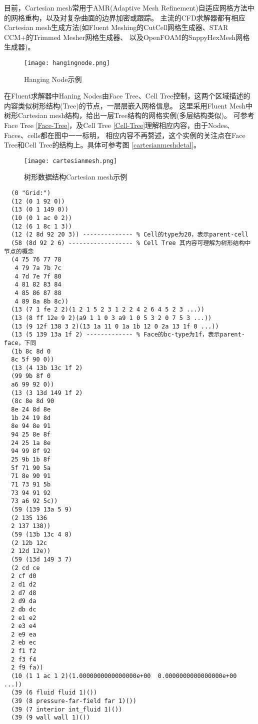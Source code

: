\documentclass[lang=cn,11pt,a4paper]{elegantpaper} %
\begin{document}
目前，Cartesian mesh常用于AMR(Adaptive Mesh Refinement)自适应网格方法中的网格重构，以及对复杂曲面的边界加密或跟踪。
主流的CFD求解器都有相应Cartesian mesh生成方法(如Fluent Meshing的CutCell网格生成器、STAR CCM+的Trimmed Mesher网格生成器、
以及OpenFOAM的SnppyHexMesh网格生成器)。
\begin{figure}[!htb]
  \centering
  \texttt{[image: hangingnode.png]}
  \caption{Hanging Node示例}
  \label{hangingnode}
\end{figure}

在Fluent求解器中Haning Nodes由Face Tree、Cell Tree控制，这两个区域描述的内容类似树形结构(Tree)的节点，一层层嵌入网格信息。
这里采用Fluent Mesh中树形Cartesian mesh结构，给出一层Tree结构的网格实例(多层结构类似)。
可参考Face Tree \ref{Face-Tree}，及Cell Tree \ref{Cell-Tree}理解相应内容，由于Nodes、Faces、cells都在图中一一标明，
相应内容不再赘述，这个实例的关注点在Face Tree和Cell Tree的结构上。具体可参考图 \ref{cartesianmeshdetal}。 
\begin{figure}[!htb]
  \centering
  \texttt{[image: cartesianmesh.png]}
  \caption{树形数据结构Cartesian mesh示例}
  \label{cartesianmeshexample}
\end{figure}

\begin{lstlisting}
  (0 "Grid:")
  (12 (0 1 92 0))
  (13 (0 1 149 0))
  (10 (0 1 ac 0 2))
  (12 (6 1 8c 1 3))
  (12 (2 8d 92 20 3)) -------------- % Cell的type为20，表示parent-cell
  (58 (8d 92 2 6) ------------------ % Cell Tree 其内容可理解为树形结构中节点的概念
  (4 75 76 77 78
   4 79 7a 7b 7c
   4 7d 7e 7f 80
   4 81 82 83 84
   4 85 86 87 88
   4 89 8a 8b 8c))
  (13 (7 1 fe 2 2)(1 2 1 5 2 3 1 2 2 4 2 6 4 5 2 3 ...))
  (13 (8 ff 12e 9 2)(a9 1 1 0 3 a9 1 0 5 3 2 0 7 5 3 ...))
  (13 (9 12f 138 3 2)(13 1a 11 0 1a 1b 12 0 2a 13 1f 0 ...))
  (13 (5 139 13a 1f 2) ------------- % Face的bc-type为1f，表示parent-face，下同
  (1b 8c 8d 0
  8c 5f 90 0))
  (13 (4 13b 13c 1f 2)
  (99 9b 8f 0
  a6 99 92 0))
  (13 (3 13d 149 1f 2)
  (8c 8e 8d 90
  8e 24 8d 8e
  1b 24 19 8d
  8e 94 8e 91
  94 25 8e 8f
  24 25 1a 8e
  94 99 8f 92
  25 9b 1b 8f
  5f 71 90 5a
  71 8e 90 91
  71 73 91 5b
  73 94 91 92
  73 a6 92 5c))
  (59 (139 13a 5 9)
  (2 135 136
  2 137 138))
  (59 (13b 13c 4 8)
  (2 12b 12c
  2 12d 12e))
  (59 (13d 149 3 7)
  (2 cd ce
  2 cf d0
  2 d1 d2
  2 d7 d8
  2 d9 da
  2 db dc
  2 e1 e2
  2 e3 e4
  2 e9 ea
  2 eb ec
  2 f1 f2
  2 f3 f4
  2 f9 fa))
  (10 (1 1 ac 1 2)(1.0000000000000000e+00  0.0000000000000000e+00 ...))
  (39 (6 fluid fluid 1)())
  (39 (8 pressure-far-field far 1)())
  (39 (7 interior int_fluid 1)())
  (39 (9 wall wall 1)())
\end{lstlisting}
\end{document}
